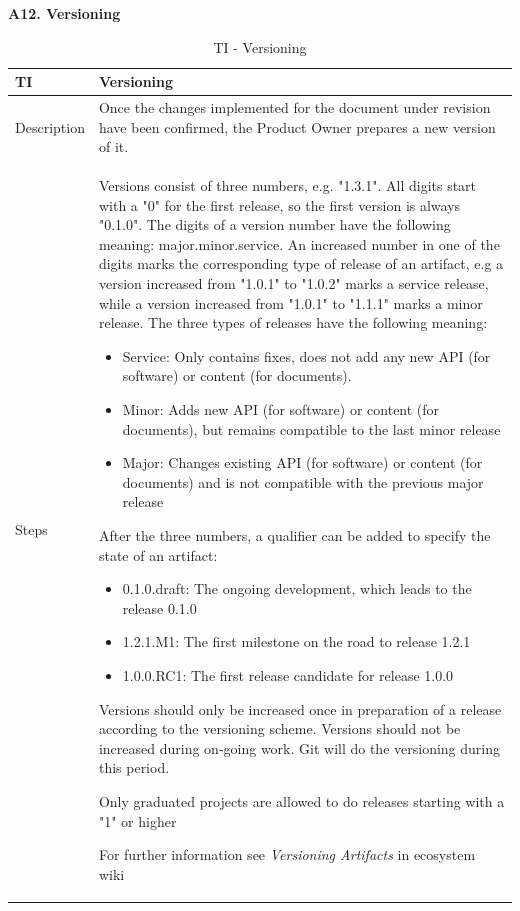 \documentclass{template/openetcs_article}
\begin{document}
\textbf{A12. Versioning}
\begin{table}[H]
\begin{tabular}{|m{2cm}|m{12cm}|}
\hline
\rowcolor{myblue}
TI & 
Versioning
\\\hline
Description &
Once the changes implemented for the document under revision have been confirmed, the Product Owner prepares a new version of it.
\\\hline
Steps &
Versions consist of three numbers, e.g. "1.3.1". All digits start with a "0" for the first release, so the first version is always "0.1.0". The digits of a version number have the following meaning: major.minor.service. An increased number in one of the digits marks the corresponding type of release of an artifact, e.g a version increased from "1.0.1" to "1.0.2" marks a service release, while a version increased from "1.0.1" to "1.1.1" marks a minor release. The three types of releases have the following meaning:
\begin{itemize}
\item Service: Only contains fixes, does not add any new API (for software) or content (for documents).
\item Minor: Adds new API (for software) or content (for documents), but remains compatible to the last minor release
\item Major: Changes existing API (for software) or content (for documents) and is not compatible with the previous major release
\end{itemize}
After the three numbers, a qualifier can be added to specify the state of an artifact:
\begin{itemize}
\item 0.1.0.draft: The ongoing development, which leads to the release 0.1.0
\item 1.2.1.M1: The first milestone on the road to release 1.2.1
\item 1.0.0.RC1: The first release candidate for release 1.0.0
\end{itemize}
Versions should only be increased once in preparation of a release according to the versioning scheme. Versions should not be increased during on-going work. Git will do the versioning during this period.

Only graduated projects are allowed to do releases starting with a "1" or higher

For further information see {\it Versioning Artifacts} in ecosystem wiki
\\\hline
\end{tabular}
\caption{TI -  Versioning}
\end{table}
\end{document}
